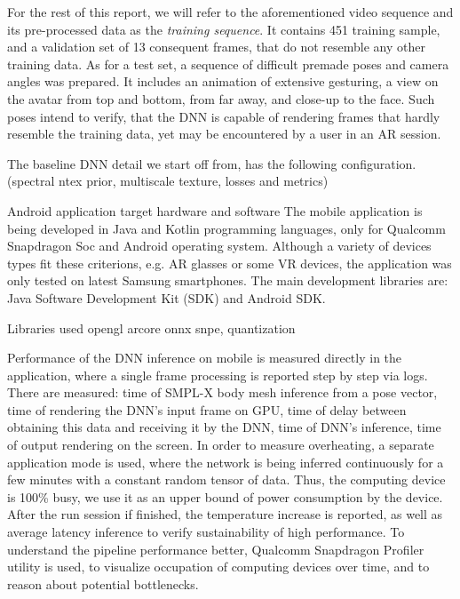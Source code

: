 For the rest of this report, we will refer to the aforementioned video sequence and its pre-processed data as the \textit{training sequence}. It contains \alert{451} training sample, and a validation set of 13 consequent frames, that do not resemble any other training data. As for a test set, a sequence of difficult premade poses and camera angles was prepared. It includes an animation of extensive gesturing, a view on the avatar from top and bottom, from far away, and close-up to the face. Such poses intend to verify, that the DNN is capable of rendering frames that hardly resemble the training data, yet may be encountered by a user in an AR session.

The baseline DNN \cite{dnn:stylepeople21} detail we start off from, has the following configuration. (spectral ntex prior, multiscale texture, losses and metrics)

Android application target hardware and software
The mobile application is being developed in Java and Kotlin programming languages, only for Qualcomm Snapdragon Soc and Android operating system. Although a variety of devices types fit these criterions, e.g. AR glasses or some VR devices, the application was only tested on latest Samsung smartphones. The main development libraries are: Java Software Development Kit (SDK) and Android SDK.

Libraries used opengl arcore onnx snpe, quantization

Performance of the DNN inference on mobile is measured directly in the application, where a single frame processing is reported step by step via logs. There are measured: time of SMPL-X body mesh inference from a pose vector, time of rendering the DNN's input frame on GPU, time of delay between obtaining this data and receiving it by the DNN, time of DNN's inference, time of output rendering on the screen. In order to measure overheating, a separate application mode is used, where the network is being inferred continuously for a few minutes with a constant random tensor of data. Thus, the computing device is 100\% busy, we use it as an upper bound of power consumption by the device. After the run session if finished, the temperature increase is reported, as well as average latency inference to verify sustainability of high performance. To understand the pipeline performance better, Qualcomm Snapdragon Profiler utility is used, to visualize occupation of computing devices over time, and to reason about potential bottlenecks.

